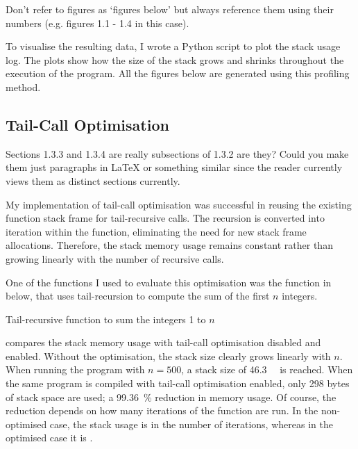 \documentclass[00-main.tex]{subfiles}
\begin{document}
\begin{Comment}
Don't refer to figures as `figures below' but always
reference them using their numbers (e.g. figures 1.1 - 1.4 in this case).
\end{Comment}

To visualise the resulting data, I wrote a Python script to plot the stack usage log.
The plots show how the size of the stack grows and shrinks throughout the execution of the program.
All the figures below are generated using this profiling method.




\subsection{Tail-Call Optimisation}

\begin{Comment}
Sections 1.3.3 and 1.3.4 are really subsections of 1.3.2 are they?
Could you make them just paragraphs in LaTeX or something similar since
the reader currently views them as distinct sections currently.
\end{Comment}

My implementation of tail-call optimisation was successful in reusing the existing function stack frame for tail-recursive calls. The recursion is converted into iteration within the function, eliminating the need for new stack frame allocations.
Therefore, the stack memory usage remains constant rather than growing linearly with the number of recursive calls.

One of the functions I used to evaluate this optimisation was the function in  below, that uses tail-recursion to compute the sum of the first $n$ integers.

\begin{listing}[ht]
  \caption{Tail-recursive function to sum the integers 1 to $n$}
  \label{lst:tail-recursive sum}
\end{listing}


 compares the stack memory usage with tail-call optimisation disabled and enabled.
Without the optimisation, the stack size clearly grows linearly with $n$.
When running the program with $n=500$, a stack size of \SI{46.3}{\kilo\byte} is reached.
When the same program is compiled with tail-call optimisation enabled, only 298 bytes of stack space are used; a \SI{99.36}{\percent} reduction in memory usage.
Of course, the reduction depends on how many iterations of the function are run.
In the non-optimised case, the stack usage is  in the number of iterations, whereas in the optimised case it is .
\end{document}
